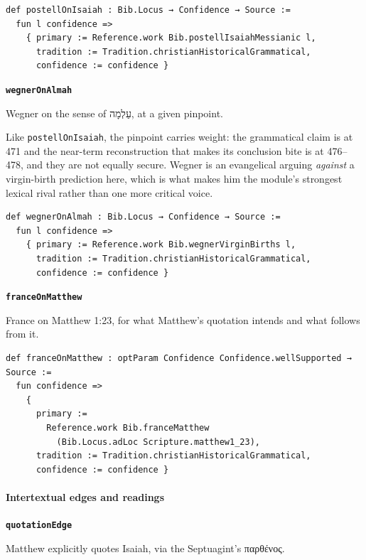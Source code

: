\documentclass[11pt]{article}
\begin{document}
{\small\begin{verbatim}
def postellOnIsaiah : Bib.Locus → Confidence → Source :=
  fun l confidence =>
    { primary := Reference.work Bib.postellIsaiahMessianic l,
      tradition := Tradition.christianHistoricalGrammatical,
      confidence := confidence }
\end{verbatim}}
\par\medskip\noindent\textbf{\texttt{wegner\allowbreak{}On\allowbreak{}Almah}}\par\nobreak\noindent
Wegner on the sense of עַלְמָה, at a given pinpoint.

Like \texttt{postell\allowbreak{}On\allowbreak{}Isaiah}, the pinpoint carries weight: the grammatical claim is at 471 and the near-term reconstruction that makes its conclusion bite is at 476–478, and they are not equally secure. Wegner is an evangelical arguing \emph{against} a virgin-birth prediction here, which is what makes him the module's strongest lexical rival rather than one more critical voice.

{\small\begin{verbatim}
def wegnerOnAlmah : Bib.Locus → Confidence → Source :=
  fun l confidence =>
    { primary := Reference.work Bib.wegnerVirginBirths l,
      tradition := Tradition.christianHistoricalGrammatical,
      confidence := confidence }
\end{verbatim}}
\par\medskip\noindent\textbf{\texttt{france\allowbreak{}On\allowbreak{}Matthew}}\par\nobreak\noindent
France on Matthew 1:23, for what Matthew's quotation intends and what follows from it.

{\small\begin{verbatim}
def franceOnMatthew : optParam Confidence Confidence.wellSupported → Source :=
  fun confidence =>
    {
      primary :=
        Reference.work Bib.franceMatthew
          (Bib.Locus.adLoc Scripture.matthew1_23),
      tradition := Tradition.christianHistoricalGrammatical,
      confidence := confidence }
\end{verbatim}}
\paragraph*{Intertextual edges and readings}
\leavevmode\par
\par\medskip\noindent\textbf{\texttt{quotation\allowbreak{}Edge}}\par\nobreak\noindent
Matthew explicitly quotes Isaiah, via the Septuagint's παρθένος.
\end{document}
